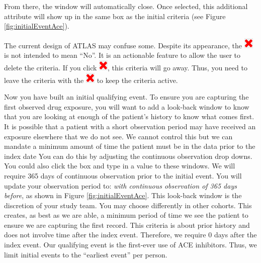 \documentclass[11pt]{book}
\theoremstyle{definition}
\theoremstyle{definition}
\theoremstyle{definition}
\theoremstyle{remark}
\let\BeginKnitrBlock\begin \let\EndKnitrBlock\end
\begin{document}
From there, the window will automatically close. Once selected, this
additional attribute will show up in the same box as the initial
criteria (see Figure \ref{fig:initialEventAce}).

\BeginKnitrBlock{rmdimportant}
The current design of ATLAS may confuse some. Despite its appearance,
the \includegraphics{images/Cohorts/redX.png} is not intended to mean
``No''. It is an actionable feature to allow the user to delete the
criteria. If you click \includegraphics{images/Cohorts/redX.png}, this
criteria will go away. Thus, you need to leave the criteria with the
\includegraphics{images/Cohorts/redX.png} to keep the criteria active.
\EndKnitrBlock{rmdimportant}

Now you have built an initial qualifying event. To ensure you are
capturing the first observed drug exposure, you will want to add a
look-back window to know that you are looking at enough of the patient's
history to know what comes first. It is possible that a patient with a
short observation period may have received an exposure elsewhere that we
do not see. We cannot control this but we can mandate a minimum amount
of time the patient must be in the data prior to the index date You can
do this by adjusting the continuous observation drop downs. You could
also click the box and type in a value to these windows. We will require
365 days of continuous observation prior to the initial event. You will
update your observation period to: \emph{with continuous observation of
365 days before}, as shown in Figure \ref{fig:initialEventAce}. This
look-back window is the discretion of your study team. You may choose
differently in other cohorts. This creates, as best as we are able, a
minimum period of time we see the patient to ensure we are capturing the
first record. This criteria is about prior history and does not involve
time after the index event. Therefore, we require 0 days after the index
event. Our qualifying event is the first-ever use of ACE inhibitors.
Thus, we limit initial events to the ``earliest event'' per person.
\end{document}

